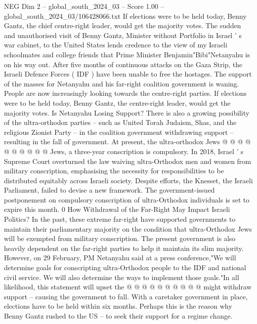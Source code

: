 \begin{textsample}{NEG Dim 2 – global\_south\_2024\_03 – Score 1.00 – global\_south\_2024\_03/106428066.txt}  \label{ex:f2_neg_429}
If elections were to be held today, Benny Gantz, the chief centre-right leader, would get the majority votes.
The sudden and unauthorised visit of Benny Gantz, Minister without Portfolio in Israel ' s war cabinet, to the United States lends credence to the view of my Israeli schoolmates and college friends that Prime Minister Benjamin"Bibi"Netanyahu is on his way out.
After five months of continuous attacks on the Gaza Strip, the Israeli Defence Forces ( IDF ) have been unable to free the hostages.
The support of the masses for Netanyahu and his far-right coalition government is waning.
People are now increasingly looking towards the centre-right parties.
If elections were to be held today, Benny Gantz, the centre-right leader, would get the majority votes.
Is Netanyahu Losing Support?
There is also a growing possibility of the ultra-orthodox parties -- such as United Torah Judaism, Shas, and the religious Zionist Party -- in the coalition government withdrawing support -- resulting in the fall of government.
At present, the ultra-orthodox Jews @ @ @ @ @ @ @ @ @ @ Jews, a three-year conscription is compulsory.
In 2018, Israel ' s Supreme Court overturned the law waiving ultra-Orthodox men and women from military conscription, emphasising the necessity for responsibilities to be distributed equitably across Israeli society.
Despite efforts, the Knesset, the Israeli Parliament, failed to devise a new framework.
The government-issued postponement on compulsory conscription of ultra-Orthodox individuals is set to expire this month. 0 How Withdrawal of the Far-Right May Impact Israeli Politics?
In the past, these extreme far-right have supported governments to maintain their parliamentary majority on the condition that ultra-Orthodox Jews will be exempted from military conscription.
The present government is also heavily dependent on the far-right parties to help it maintain its slim majority.
However, on 29 February, PM Netanyahu said at a press conference,"We will determine goals for conscripting ultra-Orthodox people to the IDF and national civil service.
We will also determine the ways to implement those goals."In all likelihood, this statement will upset the @ @ @ @ @ @ @ @ @ @ might withdraw support -- causing the government to fall.
With a caretaker government in place, elections have to be held within six months.
Perhaps this is the reason why Benny Gantz rushed to the US -- to seek their support for a regime change.

\end{textsample}
